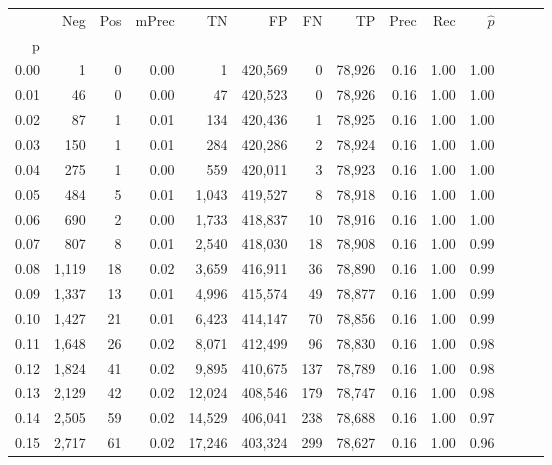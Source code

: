 \begin{tabular}{rrrrrrrrrrrrrr}
\toprule
{} &    Neg &    Pos & mPrec &       TN &       FP &      FN &      TP &  Prec &   Rec & $\hat{p}$ \\
p    &        &        &       &          &          &         &         &       &       &           \\
\midrule
0.00 &      1 &      0 &  0.00 &        1 &  420,569 &       0 &  78,926 &  0.16 &  1.00 &      1.00 \\
0.01 &     46 &      0 &  0.00 &       47 &  420,523 &       0 &  78,926 &  0.16 &  1.00 &      1.00 \\
0.02 &     87 &      1 &  0.01 &      134 &  420,436 &       1 &  78,925 &  0.16 &  1.00 &      1.00 \\
0.03 &    150 &      1 &  0.01 &      284 &  420,286 &       2 &  78,924 &  0.16 &  1.00 &      1.00 \\
0.04 &    275 &      1 &  0.00 &      559 &  420,011 &       3 &  78,923 &  0.16 &  1.00 &      1.00 \\
0.05 &    484 &      5 &  0.01 &    1,043 &  419,527 &       8 &  78,918 &  0.16 &  1.00 &      1.00 \\
0.06 &    690 &      2 &  0.00 &    1,733 &  418,837 &      10 &  78,916 &  0.16 &  1.00 &      1.00 \\
0.07 &    807 &      8 &  0.01 &    2,540 &  418,030 &      18 &  78,908 &  0.16 &  1.00 &      0.99 \\
0.08 &  1,119 &     18 &  0.02 &    3,659 &  416,911 &      36 &  78,890 &  0.16 &  1.00 &      0.99 \\
0.09 &  1,337 &     13 &  0.01 &    4,996 &  415,574 &      49 &  78,877 &  0.16 &  1.00 &      0.99 \\
0.10 &  1,427 &     21 &  0.01 &    6,423 &  414,147 &      70 &  78,856 &  0.16 &  1.00 &      0.99 \\
0.11 &  1,648 &     26 &  0.02 &    8,071 &  412,499 &      96 &  78,830 &  0.16 &  1.00 &      0.98 \\
0.12 &  1,824 &     41 &  0.02 &    9,895 &  410,675 &     137 &  78,789 &  0.16 &  1.00 &      0.98 \\
0.13 &  2,129 &     42 &  0.02 &   12,024 &  408,546 &     179 &  78,747 &  0.16 &  1.00 &      0.98 \\
0.14 &  2,505 &     59 &  0.02 &   14,529 &  406,041 &     238 &  78,688 &  0.16 &  1.00 &      0.97 \\
0.15 &  2,717 &     61 &  0.02 &   17,246 &  403,324 &     299 &  78,627 &  0.16 &  1.00 &      0.96 \\

\end{tabular}
